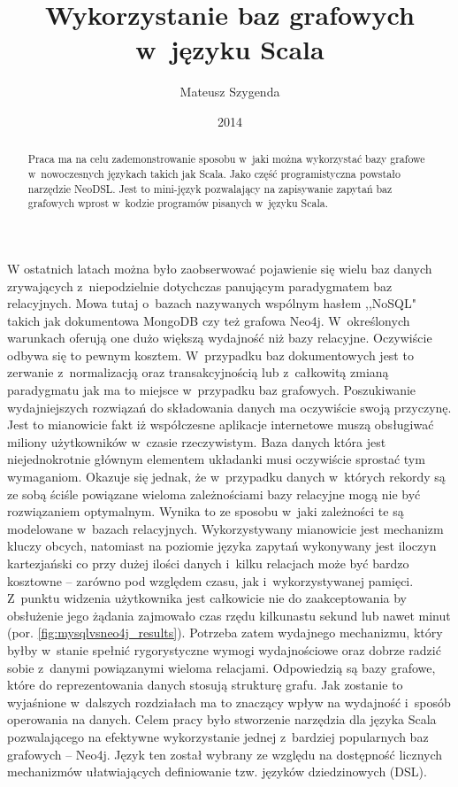 \documentclass[brudnopis]{xmgr}
\author   {Mateusz Szygenda}
\title    {Wykorzystanie baz grafowych w~języku Scala}
\date     {2014}
\begin{document}
\begin{abstract}
Praca ma na celu zademonstrowanie sposobu w~jaki można wykorzystać bazy grafowe w~nowoczesnych językach takich jak Scala. Jako część programistyczna powstało narzędzie NeoDSL. Jest to mini-język pozwalający na zapisywanie zapytań baz grafowych wprost w~kodzie programów pisanych w~języku Scala.
\end{abstract}

\maketitle

%
\introduction

W ostatnich latach można było zaobserwować pojawienie się wielu baz danych zrywających z~niepodzielnie dotychczas panującym paradygmatem baz relacyjnych. Mowa tutaj o~bazach nazywanych wspólnym hasłem ,,NoSQL" takich jak dokumentowa MongoDB czy też grafowa Neo4j. W~określonych warunkach oferują one dużo większą wydajność niż bazy relacyjne. Oczywiście odbywa się to pewnym kosztem. W~przypadku baz dokumentowych jest to zerwanie z~normalizacją oraz transakcyjnością lub z~całkowitą zmianą paradygmatu jak ma to miejsce w~przypadku baz grafowych. Poszukiwanie wydajniejszych rozwiązań do składowania danych ma oczywiście swoją przyczynę. Jest to mianowicie fakt iż współczesne aplikacje internetowe muszą obsługiwać miliony użytkowników w~czasie rzeczywistym. Baza danych która jest niejednokrotnie głównym elementem układanki musi oczywiście sprostać tym wymaganiom. Okazuje się jednak, że w~przypadku danych w~których rekordy są ze sobą ściśle powiązane wieloma zależnościami bazy relacyjne mogą nie być rozwiązaniem optymalnym. Wynika to ze sposobu w~jaki zależności te są modelowane w~bazach relacyjnych. Wykorzystywany mianowicie jest mechanizm kluczy obcych, natomiast na poziomie języka zapytań wykonywany jest iloczyn kartezjański co przy dużej ilości danych i~kilku relacjach może być bardzo kosztowne -- zarówno pod względem czasu, jak i~wykorzystywanej pamięci. Z~punktu widzenia użytkownika jest całkowicie nie do zaakceptowania by obsłużenie jego żądania zajmowało czas rzędu kilkunastu sekund lub nawet minut (por. \ref{fig:mysqlvsneo4j_results}). Potrzeba zatem wydajnego mechanizmu, który byłby w~stanie spełnić rygorystyczne wymogi wydajnościowe oraz dobrze radzić sobie z~danymi powiązanymi wieloma relacjami. Odpowiedzią są bazy grafowe, które do reprezentowania danych stosują strukturę grafu. Jak zostanie to wyjaśnione  w~dalszych rozdziałach ma to znaczący wpływ na wydajność i~sposób operowania na danych. Celem pracy było stworzenie narzędzia dla języka Scala pozwalającego na efektywne wykorzystanie jednej z~bardziej popularnych baz grafowych -- Neo4j. Język ten został wybrany ze względu na dostępność licznych mechanizmów ułatwiających definiowanie tzw. języków dziedzinowych (DSL).
\end{document}
